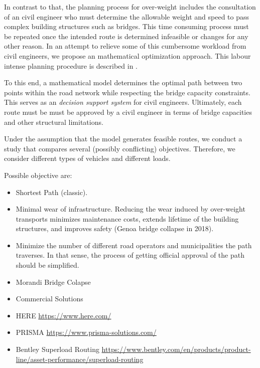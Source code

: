 In contrast to that, the planning process for over-weight includes the consultation
of an civil engineer who must determine the allowable weight and speed to pass
complex building structures such as bridges.
This time consuming process must be repeated once the intended route is determined infeasible or changes for any other reason.
In an attempt to relieve some of this cumbersome workload from civil engineers,
we propose an mathematical optimization approach.
This labour intense planning procedure is described in
\citet{Osegueda.1999}.

To this end, a mathematical model determines the optimal path between two
points within the road network while respecting the bridge capacity constraints.
This serves as an \textit{decision support system} for civil engineers.
Ultimately,  each route must be must be approved by a civil engineer  in terms of
bridge capacities and other structural limitations.

Under the assumption that the model generates feasible routes,
we conduct a study that compares several (possibly conflicting) objectives.
Therefore, we consider different types of vehicles and different loads.

Possible objective are:
\begin{itemize}
  \item Shortest Path (classic).

  \item Minimal wear of infrastructure. Reducing the wear induced by over-weight transports
  minimizes maintenance costs, extends lifetime of the building structures, and
  improves safety (Genoa bridge collapse in 2018).

  \item Minimize the number of different road operators and municipalities the path
  traverses. In that sense, the process of getting official approval of the
  path should be simplified.
\end{itemize}

\begin{itemize}
\item Morandi Bridge Colapse

\cite{Morgese.2020}
\cite{MorandiNYTimes}


\item Commercial Solutions

\item HERE
\url{https://www.here.com/}
\item PRISMA
\url{https://www.prisma-solutions.com/}

\item Bentley Superload Routing
\url{https://www.bentley.com/en/products/product-line/asset-performance/superload-routing}

\end{itemize}
